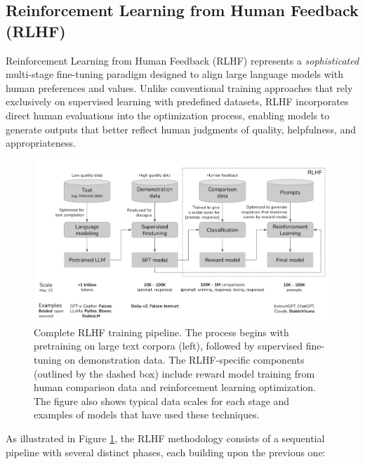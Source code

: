 \subsection{Reinforcement Learning from Human Feedback (RLHF)}
Reinforcement Learning from Human Feedback (RLHF) represents a \textit{sophisticated} multi-stage fine-tuning paradigm designed to align large language models with human preferences and values. Unlike conventional training approaches that rely exclusively on supervised learning with predefined datasets, RLHF incorporates direct human evaluations into the optimization process, enabling models to generate outputs that better reflect human judgments of quality, helpfulness, and appropriateness.

\begin{figure}[t]
\centering
\includegraphics[width=\linewidth]{img/chap05/5.2.7.png}
\caption{Complete RLHF training pipeline. The process begins with pretraining on large text corpora (left), followed by supervised fine-tuning on demonstration data. The RLHF-specific components (outlined by the dashed box) include reward model training from human comparison data and reinforcement learning optimization. The figure also shows typical data scales for each stage and examples of models that have used these techniques.}
\label{fig:rlhf_pipeline}
\end{figure}

As illustrated in Figure \ref{fig:rlhf_pipeline}, the RLHF methodology consists of a sequential pipeline with several distinct phases, each building upon the previous one:

